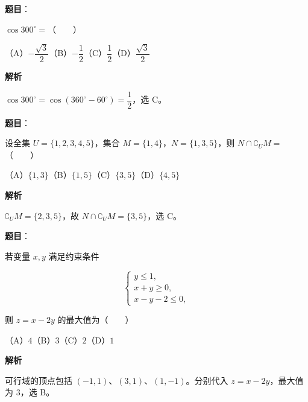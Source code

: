 

\begin{answer}

\textbf{题目}：

$\cos300^\circ=$\mbox{（　　）}

（A）$-\dfrac{\sqrt3}{2}$\quad（B）$-\dfrac12$\quad（C）$\dfrac12$\quad（D）$\dfrac{\sqrt3}{2}$

\textbf{解析}

$\cos300^\circ=\cos(360^\circ-60^\circ)=\dfrac12$，选 C。


\end{answer}
\begin{answer}

\textbf{题目}：

设全集 $U=\{1,2,3,4,5\}$，集合 $M=\{1,4\}$，$N=\{1,3,5\}$，则 $N\cap\complement_U M=$\mbox{（　　）}

（A）$\{1,3\}$\quad（B）$\{1,5\}$\quad（C）$\{3,5\}$\quad（D）$\{4,5\}$

\textbf{解析}

$\complement_U M=\{2,3,5\}$，故
$N\cap\complement_U M=\{3,5\}$，选 C。


\end{answer}
\begin{answer}

\textbf{题目}：

若变量 $x,y$ 满足约束条件

\nopagebreak[4]
\[
\begin{cases}
y\leq 1,\\
x+y\geq0,\\
x-y-2\leq0,
\end{cases}
\]

则 $z=x-2y$ 的最大值为\mbox{（　　）}

（A）$4$\quad（B）$3$\quad（C）$2$\quad（D）$1$

\textbf{解析}

可行域的顶点包括 $(-1,1)$、$(3,1)$、$(1,-1)$。分别代入
$z=x-2y$，最大值为 $3$，选 B。


\end{answer}

